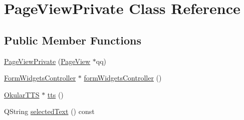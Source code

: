 \hypertarget{classPageViewPrivate}{\section{Page\+View\+Private Class Reference}
\label{classPageViewPrivate}
}
\subsection*{Public Member Functions}
\begin{DoxyCompactItemize}
\item 
\hyperlink{classPageViewPrivate_ac3701892031a5b51f110cbd0f389ddf7}{Page\+View\+Private} (\hyperlink{classPageView}{Page\+View} $\ast$qq)
\item 
\hyperlink{classFormWidgetsController}{Form\+Widgets\+Controller} $\ast$ \hyperlink{classPageViewPrivate_a9265244018f7c818fe3c605397a14540}{form\+Widgets\+Controller} ()
\item 
\hyperlink{classOkularTTS}{Okular\+T\+T\+S} $\ast$ \hyperlink{classPageViewPrivate_afec701325b31f3ef894801171a11353f}{tts} ()
\item 
Q\+String \hyperlink{classPageViewPrivate_a0ecc0d9ad35e6990bc4b82f3649fc6c4}{selected\+Text} () const 
\end{DoxyCompactItemize}

